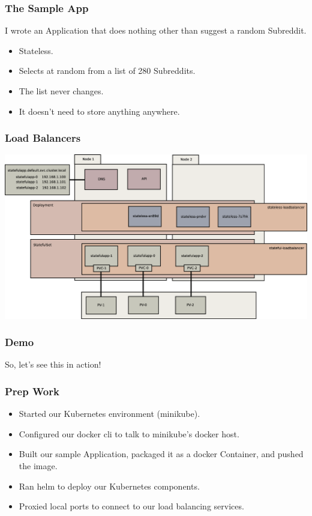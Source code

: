     \begin{frame}
        \frametitle{The Sample App}
        I wrote an Application that does nothing other than suggest a random Subreddit.\pause
        \begin{itemize}
            \item Stateless.\pause
            \item Selects at random from a list of 280 Subreddits.\pause
            \item The list never changes.\pause
            \item It doesn't need to store anything anywhere.
        \end{itemize}
    \end{frame}

    \begin{frame}
        \frametitle{Load Balancers}
        \includegraphics[width=\textwidth,height=0.85\textheight,keepaspectratio]{graphics/08-loadBalancer.eps}
    \end{frame}

    \begin{frame}
        \frametitle{Demo}
        \begin{center}
            \Huge So, let's see this in action!
        \end{center}
    \end{frame}

    \begin{frame}
        \frametitle{Prep Work}
        \begin{itemize}
            \item Started our Kubernetes environment (minikube).\pause
            \item Configured our docker cli to talk to minikube's docker host.\pause
            \item Built our sample Application, packaged it as a docker Container, and pushed the image.\pause
            \item Ran helm to deploy our Kubernetes components.\pause
            \item Proxied local ports to connect to our load balancing services.
        \end{itemize}
    \end{frame}

